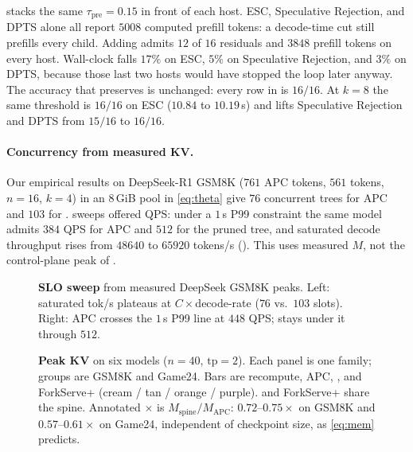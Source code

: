  stacks the same $\tau_{\mathrm{pre}}{=}0.15$ in front of each host.
ESC, Speculative Rejection, and DPTS alone all report $5008$ computed prefill tokens: a decode-time cut still prefills every child.
Adding \app admits $12$ of $16$ residuals and $3848$ prefill tokens on every host.
Wall-clock falls $17\%$ on ESC, $5\%$ on Speculative Rejection, and $3\%$ on DPTS, because those last two hosts would have stopped the loop later anyway.
The accuracy that  preserves is unchanged: every row in  is $16/16$.
At $k{=}8$ the same threshold is $16/16$ on ESC ($10.84$ to $10.19$\,s) and lifts Speculative Rejection and DPTS from $15/16$ to $16/16$.

\paragraph{Concurrency from measured KV.}
Our empirical results on DeepSeek-R1 GSM8K ($761$ APC tokens, $561$ \sys tokens, $n{=}16$, $k{=}4$) in an $8$\,GiB pool in \eqref{eq:theta} give $76$ concurrent trees for APC and $103$ for \sys.
 sweeps offered QPS: under a $1$\,s P99 \ttft{} constraint the same model admits $384$ QPS for APC and $512$ for the pruned tree, and saturated decode throughput rises from $48640$ to $65920$ tokens/s ().
This uses measured $M$, not the control-plane peak of .

\begin{figure}[t]
\centering
\resizebox{\columnwidth}{!}{}
\caption{\textbf{SLO sweep} from measured DeepSeek GSM8K peaks.
Left: saturated tok/s plateaus at $C{\times}$decode-rate ($76$ vs.\ $103$ slots).
Right: APC crosses the $1$\,s P99 line at $448$ QPS; \sys{} stays under it through $512$.}
\label{fig:eval-slo}
\end{figure}

\begin{figure}[t]
\centering
\resizebox{\textwidth}{!}{}
\caption{\textbf{Peak KV} on six models ($n{=}40$, $\mathrm{tp}{=}2$).
Each panel is one family; groups are GSM8K and Game24.
Bars are recompute, APC, \sys, and ForkServe+ (cream / tan / orange / purple).
\sys{} and ForkServe+ share the spine.
Annotated $\times$ is $M_{\mathrm{spine}}/M_{\mathrm{APC}}$: $0.72$--$0.75\times$ on GSM8K and $0.57$--$0.61\times$ on Game24, independent of checkpoint size, as \eqref{eq:mem} predicts.}
\label{fig:eval-multi}
\end{figure}

